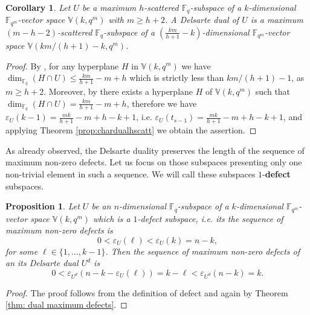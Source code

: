 \documentclass[11pt]{amsart}
\newtheorem{corollary}[theorem]{Corollary}
\newtheorem{proposition}[theorem]{Proposition}
\newcommand{\fqm}{\mathbb{F}_{q^m}}
\newcommand{\fq}{{\mathbb F}_{q}}
\begin{document}
\begin{corollary}\label{cor:dualmaxhscatt}
    Let $U$ be a maximum $h$-scattered $\fq$-subspace of a $k$-dimensional $\fqm$-vector space $\mathbb{V}(k,q^m)$ with $m\geq h+2$.
    A Delsarte dual of $U$ is a maximum $(m-h-2)$-scattered $\fq$-subspace of a $(\frac{km}{h+1}-k)$-dimensional $\fqm$-vector space $\mathbb{V}(km/(h+1)-k,q^m)$.
\end{corollary}
\begin{proof}
    By \cite[Theorem 2.7]{csajbok2021generalising}, for any hyperplane $H$ in $\mathbb{V}(k,q^m)$ we have $\dim_{\fq}(H\cap U)\leq \frac{km}{h+1}-m+h$ which is strictly less than $km/(h+1)-1$, as $m\geq h+2$.
    Moreover, by \cite[Theorem 7.1]{zini2021scattered} there exists a hyperplane $H$ of $\mathbb{V}(k,q^m)$ such that $\dim_{\fq}(H\cap U)= \frac{km}{h+1}-m+h$, therefore we have  $\varepsilon_U(k-1)=\frac{mk}{h+1}-m+h-k+1$, i.e. $\varepsilon_U(t_{s-1})=\frac{mk}{h+1}-m+h-k+1$, and applying Theorem \ref{prop:chardualhscatt} we obtain the assertion.
\end{proof}

As already observed, the Delsarte duality preserves the length of the sequence of maximum non-zero defects.
Let us focus on those subspaces presenting only one non-trivial element in such a sequence. We will call these subspaces $1$-\textbf{defect} subspaces.

\begin{proposition}\label{prop:dual1-defect}
    Let $U$ be an $n$-dimensional $\fq$-subspace of a $k$-dimensional $\fqm$-vector space $\mathbb{V}(k,q^m)$ which is a $1$-defect subspace, i.e. its the sequence of maximum non-zero defects is
    \[ 0 < \varepsilon_U(\ell)  <\varepsilon_U(k)=n-k,\]
    for some $\ell \in \{1,\ldots,k-1\}$.
    Then the sequence of maximum non-zero defects of an its Delsarte dual $U^d$ is 
    \[0< \varepsilon_{U^d}(n-k-\varepsilon_U(\ell))=k-\ell <\varepsilon_{U^d}(n-k)=k.
    \]
\end{proposition}
\begin{proof}
    The proof follows from the definition of defect and again by Theorem \ref{thm: dual maximum defects}.
\end{proof}
\end{document}
